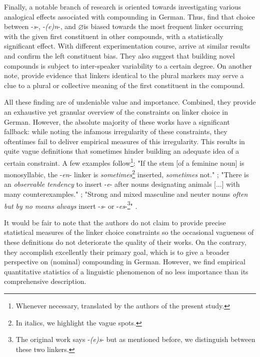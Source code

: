 \documentclass[10pt, a4paper]{article}
\newcommand{\zeroLinker}{\ensuremath{\boldsymbol{\varnothing}}}
\begin{document}
Finally, a notable branch of research is oriented towards investigating various analogical effects associated with compounding in German. Thus, \citet{krott_etal_2007} find that choice between -\textit{s}-, -\textit{(e)n}-, and \zeroLinker is biased towards the most frequent linker occurring with the given first constituent in other compounds, with a statistically significant effect. With different experimentation course, \citet{neef_borgwaldt_2012} arrive at similar results and confirm the left constituent bias. They also suggest that building novel compounds is subject to inter-speaker variability to a certain degree. On another note, \citet{schaefer_pankratz_2018} provide evidence that linkers identical to the plural markers may serve a clue to a plural or collective meaning of the first constituent in the compound.

All these finding are of undeniable value and importance. Combined, they provide an exhaustive yet granular overview of the constraints on linker choice in German. However, the absolute majority of these works have a significant fallback: while noting the infamous irregularity of these constraints, they oftentimes fail to deliver empirical measures of this irregularity. This results in quite vague definitions that sometimes hinder building an adequate idea of a certain constraint. A few examples follow\footnote{Whenever necessary, translated by the authors of the present study.}: "If the stem [of a feminine noun] is monosyllabic, the -\textit{en}- linker is \textit{sometimes}\footnote{In italics, we highlight the vague spots.} inserted, \textit{sometimes} not." \citep[229]{eisenberg_2013}; "There is an \textit{observable tendency} to insert -\textit{e}- after nouns designating animals [...] with many counterexamples." \citep[11]{nuebling_szczepaniak_2008}; "Strong and mixed masculine and neuter nouns \textit{often but by no means always} insert -\textit{s}- or -\textit{es}-\footnote{The original work says -\textit{(e)s}- but as mentioned before, we distinguish between these two linkers.}" \citep[229]{schaefer_2018}.

It would be fair to note that the authors do not claim to provide precise statistical measures of the linker choice constraints so the occasional vagueness of these definitions do not deteriorate the quality of their works. On the contrary, they accomplish excellently their primary goal, which is to give a broader perspective on (nominal) compounding in German. However, we find empirical quantitative statistics of a linguistic phenomenon of no less importance than its comprehensive description.
\end{document}
